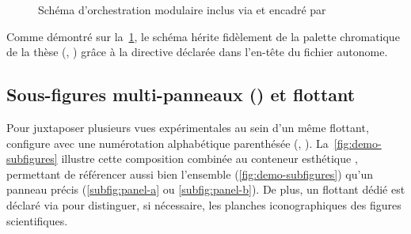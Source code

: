 \begin{figure}[htbp]
  \centering
  \begin{cadreFigure}
    \centering
    
  \end{cadreFigure}
  \caption[Schéma d'orchestration modulaire]{Schéma d'orchestration modulaire inclus via  et encadré par }
  \label{fig:architecture-projet}
\end{figure}

Comme démontré sur la~\cref{fig:architecture-projet},
le schéma hérite fidèlement de la palette chromatique de la thèse (, )
grâce à la directive  déclarée dans l'en-tête du fichier autonome.

\subsection{Sous-figures multi-panneaux () et flottant }
Pour juxtaposer plusieurs vues expérimentales au sein d'un même flottant,  configure  avec une numérotation alphabétique parenthésée (, ).
La~\cref{fig:demo-subfigures} illustre cette composition combinée au conteneur esthétique , permettant de référencer aussi bien l'ensemble (\cref{fig:demo-subfigures}) qu'un panneau précis (\cref{subfig:panel-a} ou \cref{subfig:panel-b}).
De plus, un flottant dédié  est déclaré via  pour distinguer, si nécessaire, les planches iconographiques des figures scientifiques.

